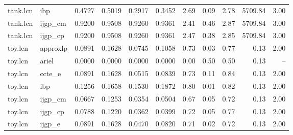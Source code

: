 \begin{table}[ht]
\begin{tabular}{llrrrrrrrrr}
tank.lcn & ibp & 0.4727 & 0.5019 & 0.2917 & 0.3452 & 2.69 & 0.09 & 2.78 & 5709.84 & 3.00 \\
tank.lcn & ijgp_cm & 0.9200 & 0.9508 & 0.9260 & 0.9361 & 2.41 & 0.46 & 2.87 & 5709.84 & 3.00 \\
tank.lcn & ijgp_cp & 0.9200 & 0.9508 & 0.9260 & 0.9361 & 2.47 & 0.38 & 2.85 & 5709.84 & 3.00 \\
toy.lcn & approxlp & 0.0891 & 0.1628 & 0.0745 & 0.1058 & 0.73 & 0.03 & 0.77 & 0.13 & 2.00 \\
toy.lcn & ariel & 0.0000 & 0.0000 & 0.0000 & 0.0000 & 0.00 & 0.50 & 0.50 & 0.13 & -- \\
toy.lcn & ccte_e & 0.0891 & 0.1628 & 0.0515 & 0.0839 & 0.73 & 0.11 & 0.84 & 0.13 & 2.00 \\
toy.lcn & ibp & 0.1256 & 0.1658 & 0.1530 & 0.1872 & 0.80 & 0.01 & 0.82 & 0.13 & 2.00 \\
toy.lcn & ijgp_cm & 0.0667 & 0.1253 & 0.0354 & 0.0504 & 0.67 & 0.05 & 0.72 & 0.13 & 2.00 \\
toy.lcn & ijgp_cp & 0.0788 & 0.1220 & 0.0362 & 0.0399 & 0.72 & 0.05 & 0.77 & 0.13 & 2.00 \\
toy.lcn & ijgp_e & 0.0891 & 0.1628 & 0.0470 & 0.0820 & 0.71 & 0.02 & 0.72 & 0.13 & 2.00 \\
\bottomrule
\end{tabular}
\end{table}
